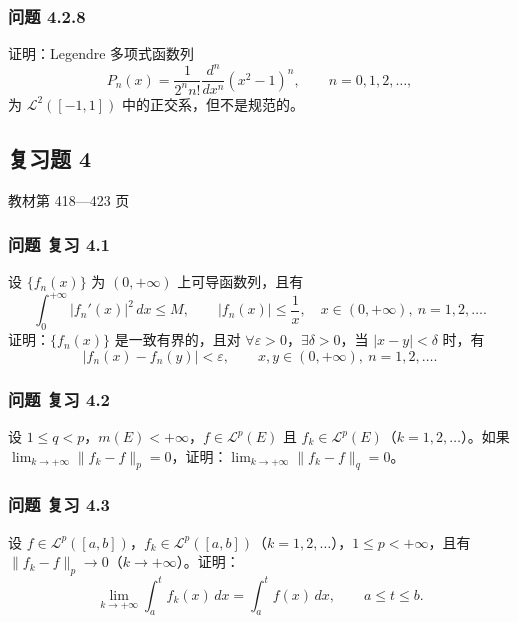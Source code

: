 \documentclass[11pt,a4paper]{article}
\begin{document}
\subsubsection{问题 4.2.8}\label{ch04-practice-ux95eeux9898-4.2.8}

证明：Legendre 多项式函数列 \[
P_n(x)=\frac1{2^n n!}\frac{d^n}{dx^n}(x^2-1)^n,\qquad n=0,1,2,\ldots,
\] 为 \(\mathcal L^2([-1,1])\) 中的正交系，但不是规范的。

\subsection{复习题 4}\label{ch04-practice-ux590dux4e60ux9898-4}

教材第 418---423 页

\subsubsection{问题 复习 4.1}\label{ch04-practice-ux95eeux9898-ux590dux4e60-4.1}

设 \(\{f_n(x)\}\) 为 \((0,+\infty)\) 上可导函数列，且有 \[
\int_0^{+\infty}|f_n'(x)|^2\,dx\le M,\qquad
|f_n(x)|\le\frac1x,\quad x\in(0,+\infty),\ n=1,2,\ldots.
\] 证明：\(\{f_n(x)\}\) 是一致有界的，且对
\(\forall\varepsilon>0\)，\(\exists\delta>0\)，当 \(|x-y|<\delta\)
时，有 \[
|f_n(x)-f_n(y)|<\varepsilon,\qquad x,y\in(0,+\infty),\ n=1,2,\ldots.
\]

\subsubsection{问题 复习 4.2}\label{ch04-practice-ux95eeux9898-ux590dux4e60-4.2}

设 \(1\le q<p\)，\(m(E)<+\infty\)，\(f\in\mathcal L^p(E)\) 且
\(f_k\in\mathcal L^p(E)\)（\(k=1,2,\ldots\)）。如果
\(\lim_{k\to+\infty}\|f_k-f\|_p=0\)，证明：\(\lim_{k\to+\infty}\|f_k-f\|_q=0\)。

\subsubsection{问题 复习 4.3}\label{ch04-practice-ux95eeux9898-ux590dux4e60-4.3}

设
\(f\in\mathcal L^p([a,b])\)，\(f_k\in\mathcal L^p([a,b])\)（\(k=1,2,\ldots\)），\(1\le p<+\infty\)，且有
\(\|f_k-f\|_p\to0\)（\(k\to+\infty\)）。证明： \[
\lim_{k\to+\infty}\int_a^t f_k(x)\,dx=\int_a^t f(x)\,dx,\qquad a\le t\le b.
\]
\end{document}
